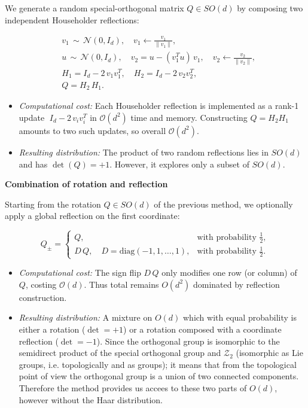 \documentclass{article}
\theoremstyle{plain}
\theoremstyle{definition}
\theoremstyle{remark}
\begin{document}
We generate a random special-orthogonal matrix $Q\in SO(d)$ by composing two independent Householder reflections:

\begin{equation*}
  \begin{aligned}
    &v_1 \,\sim\, \mathcal{N}(0,I_d),\quad 
      v_1 \leftarrow \frac{v_1}{\|v_1\|},\\
    &u   \,\sim\, \mathcal{N}(0,I_d),\quad 
      v_2 = u - (v_1^T u)\,v_1,\quad
      v_2 \leftarrow \frac{v_2}{\|v_2\|},\\
    &H_1 = I_d - 2\,v_1 v_1^T,\quad
    H_2 = I_d - 2\,v_2 v_2^T,\\
    &Q = H_2\,H_1.
  \end{aligned}
\end{equation*}

\begin{itemize}
  \item \emph{Computational cost:}  
    Each Householder reflection is implemented as a rank-1 update  
    $\;I_d - 2\,v_i v_i^T$\; in $\mathcal{O}(d^2)$ time and memory.  Constructing $Q = H_2H_1$ amounts to two such updates, so overall $\mathcal{O}(d^2)$.
  \item \emph{Resulting distribution:}  
    The product of two random reflections lies in $SO(d)$ and has $\det(Q)=+1$.  However, it explores only a subset of $SO(d)$.
\end{itemize}

\textbf{Combination of rotation and reflection}

Starting from the rotation $Q\in SO(d)$ of the previous method, we optionally apply a global reflection on the first coordinate:

\begin{equation*}
  Q_{\pm} = 
    \begin{cases}
      Q, &\text{with probability } \tfrac12,\\
      D\,Q,\quad D = \mathrm{diag}(-1,1,\dots,1), 
         &\text{with probability } \tfrac12.
    \end{cases}
\end{equation*}

\begin{itemize}
  \item \emph{Computational cost:}  
    The sign flip $D\,Q$ only modifies one row (or column) of $Q$, costing $\mathcal{O}(d)$.  Thus total remains $O(d^2)$ dominated by reflection construction.
  \item \emph{Resulting distribution:}  
    A mixture on $O(d)$ which with equal probability is either a rotation ($\det=+1$) or a rotation composed with a coordinate reflection ($\det=-1$). Since the orthogonal group is isomorphic to the semidirect product of the special orthogonal group and $\mathcal{Z}_2$ (isomorphic as Lie groups, i.e. topologically and as groups); it means that from the topological point of view the orthogonal group is a union of two connected components. Therefore the method provides us accees to these two parts of $O(d)$, however without the Haar distribution.
\end{itemize}
\end{document}
